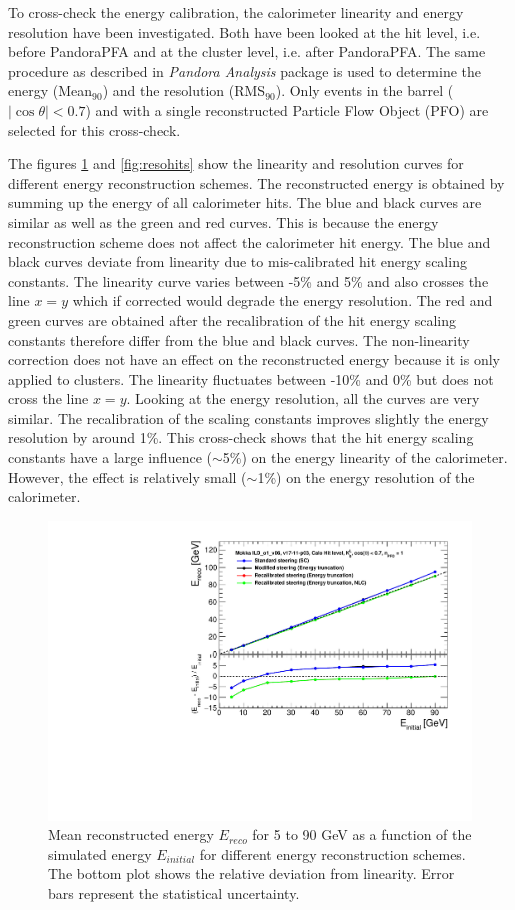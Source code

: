 To cross-check the energy calibration, the calorimeter linearity and energy resolution have been investigated. Both have been looked at the hit level, i.e. before PandoraPFA and at the cluster level, i.e. after PandoraPFA. The same procedure as described in \textit{Pandora Analysis} package is used to determine the energy (Mean$_{90}$) and the resolution (RMS$_{90}$). Only events in the barrel ($|\cos\theta| < 0.7$) and with a single reconstructed Particle Flow Object (PFO) are selected for this cross-check.

The figures \ref{fig:linhits} and \ref{fig:resohits} show the linearity and resolution curves for different energy reconstruction schemes. The reconstructed energy is obtained by summing up the energy of all calorimeter hits. The blue and black curves are similar as well as the green and red curves. This is because the energy reconstruction scheme does not affect the calorimeter hit energy. The blue and black curves deviate from linearity due to mis-calibrated hit energy scaling constants. The linearity curve varies between -5\% and 5\% and also crosses the line $x=y$ which if corrected would degrade the energy resolution. The red and green curves are obtained after the recalibration of the hit energy scaling constants therefore differ from the blue and black curves. The non-linearity correction does not have an effect on the reconstructed energy because it is only applied to clusters. The linearity fluctuates between -10\% and 0\% but does not cross the line $x=y$. Looking at the energy resolution, all the curves are very similar. The recalibration of the scaling constants improves slightly the energy resolution by around 1\%. This cross-check shows that the hit energy scaling constants have a large influence ($\sim$5\%) on the energy linearity of the calorimeter. However, the effect is relatively small ($\sim$1\%) on the energy resolution of the calorimeter.

\begin{figure}[htbp!]
  \centering
  \includegraphics[width=0.6\linewidth]{../Thesis_Plots/ILD/CheckCalib/Comparison_linearity_Curves_Hits}
  \caption{Mean reconstructed energy $E_{reco}$ for 5 to 90 GeV \kzeroL{} as a function of the simulated energy $E_{initial}$ for different energy reconstruction schemes. The bottom plot shows the relative deviation from linearity. Error bars represent the statistical uncertainty.} \label{fig:linhits}
\end{figure}

